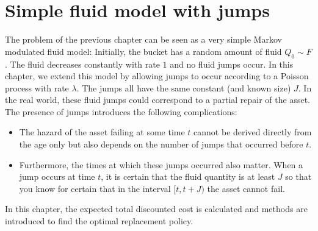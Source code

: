 \chapter{Simple fluid model with jumps}\label{chapter:SimpleFluid}
The problem of the previous chapter can be seen as a very simple Markov modulated fluid model:
Initially, the bucket has a random amount of fluid $Q_0\sim F$.
The fluid decreases constantly with rate $1$ and no fluid jumps occur.
In this chapter, we extend this model by allowing jumps to occur according to a Poisson process with rate $\lambda$.
The jumps all have the same constant (and known size) $J$.
In the real world, these fluid jumps could correspond to a partial repair of the asset.
The presence of jumps introduces the following complications:
\begin{itemize}
	\item The hazard of the asset failing at some time $t$ cannot be derived directly from the age only but also depends on the number of jumps that occurred before $t$.
	\item Furthermore, the times at which these jumps occurred also matter.
	When a jump occurs at time $t$, it is certain that the fluid quantity is at least $J$ so that you know for certain that in the interval $[t,t+J)$ the asset cannot fail.
\end{itemize}
In this chapter, the expected total discounted cost is calculated and methods are introduced to find the optimal replacement policy.



%



